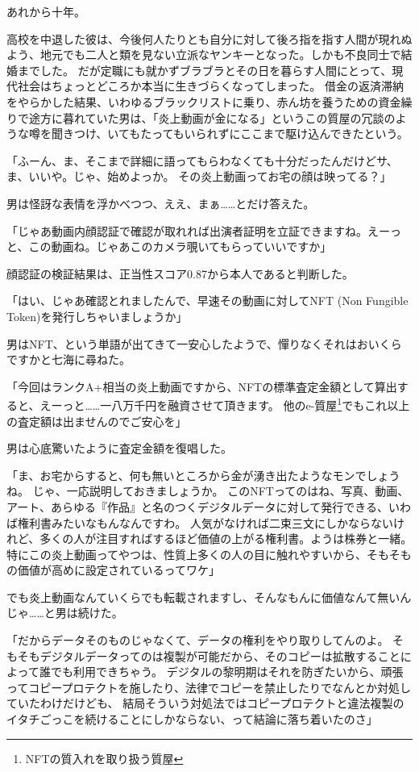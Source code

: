 あれから十年。

高校を中退した彼は、今後何人たりとも自分に対して後ろ指を指す人間が現れぬよう、地元でも二人と類を見ない立派なヤンキーとなった。しかも不良同士で結婚までした。
だが定職にも就かずブラブラとその日を暮らす人間にとって、現代社会はちょっとどころか本当に生きづらくなってしまった。
借金の返済滞納をやらかした結果、いわゆるブラックリストに乗り、赤ん坊を養うための資金繰りで途方に暮れていた男は、「炎上動画が金になる」というこの質屋の冗談のような噂を聞きつけ、いてもたってもいられずにここまで駆け込んできたという。

「ふーん、ま、そこまで詳細に語ってもらわなくても十分だったんだけどサ、ま、いいや。じゃ、始めよっか。
その炎上動画ってお宅の顔は映ってる？」

男は怪訝な表情を浮かべつつ、ええ、まぁ……とだけ答えた。

「じゃあ動画内顔認証で確認が取れれば出演者証明を立証できますね。えーっと、この動画ね。じゃあこのカメラ覗いてもらっていいですか」

顔認証の検証結果は、正当性スコア0.87から本人であると判断した。

「はい、じゃあ確認とれましたんで、早速その動画に対してNFT (Non Fungible Token)を発行しちゃいましょうか」

男はNFT、という単語が出てきて一安心したようで、憚りなくそれはおいくらですかと七海に尋ねた。

「今回はランクA+相当の炎上動画ですから、NFTの標準査定金額として算出すると、えーっと……一八万千円を融資させて頂きます。
他のe-質屋\footnote{NFTの質入れを取り扱う質屋}でもこれ以上の査定額は出ませんのでご安心を」

男は心底驚いたように査定金額を復唱した。

「ま、お宅からすると、何も無いところから金が湧き出たようなモンでしょうね。
じゃ、一応説明しておきましょうか。
このNFTってのはね、写真、動画、アート、あらゆる『作品』と名のつくデジタルデータに対して発行できる、いわば権利書みたいなもんなんですわ。
人気がなければ二束三文にしかならないけれど、多くの人が注目すればするほど価値の上がる権利書。ようは株券と一緒。
特にこの炎上動画ってやつは、性質上多くの人の目に触れやすいから、そもそもの価値が高めに設定されているってワケ」

でも炎上動画なんていくらでも転載されますし、そんなもんに価値なんて無いんじゃ……と男は続けた。

「だからデータそのものじゃなくて、データの権利をやり取りしてんのよ。
そもそもデジタルデータってのは複製が可能だから、そのコピーは拡散することによって誰でも利用できちゃう。
デジタルの黎明期はそれを防ぎたいから、頑張ってコピープロテクトを施したり、法律でコピーを禁止したりでなんとか対処していたわけだけども、
結局そういう対処法ではコピープロテクトと違法複製のイタチごっこを続けることにしかならない、って結論に落ち着いたのさ」

